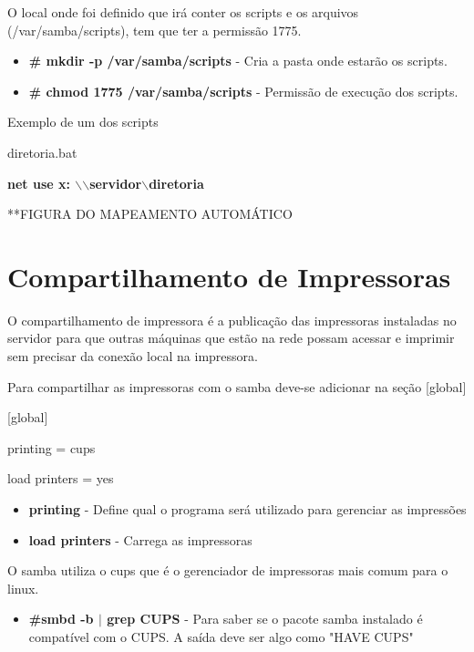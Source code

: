
O local onde foi definido que irá conter os scripts e os arquivos (/var/samba/scripts), tem que ter a permissão 1775. 

\begin{itemize}
	\item \textbf{\# mkdir -p /var/samba/scripts} - Cria a pasta onde estarão os scripts.
	\item \textbf{\# chmod 1775 /var/samba/scripts} - Permissão de execução dos scripts.
\end{itemize}

Exemplo de um dos scripts 

diretoria.bat 

\textbf{net use x: $\backslash$$\backslash$servidor$\backslash$diretoria}

**FIGURA DO MAPEAMENTO AUTOMÁTICO 

\section{Compartilhamento de Impressoras}

O compartilhamento de impressora é a publicação das impressoras instaladas no servidor para que outras máquinas que estão na rede possam acessar e imprimir sem precisar da conexão local na impressora.

Para compartilhar as impressoras com o samba deve-se adicionar na seção [global] 

[global]

printing = cups

load printers = yes

\begin{itemize}
	\item \textbf{printing} - Define qual o programa será utilizado para gerenciar as impressões 
	\item \textbf{load printers} - Carrega as impressoras
\end{itemize}

O samba utiliza o cups que é o gerenciador de impressoras mais comum para o linux.

\begin{itemize}
	\item \textbf{\#smbd -b $|$ grep CUPS} - Para saber se o pacote samba instalado é compatível com o CUPS. A saída deve ser algo como "HAVE CUPS"
\end{itemize}

